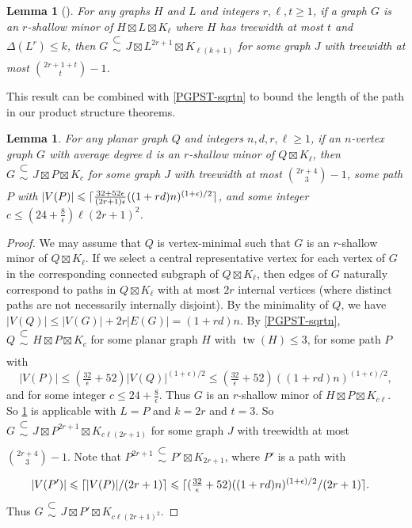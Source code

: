 \documentclass[11pt]{article}
\DeclarePairedDelimiter{\ceil}{\lceil}{\rceil}
\renewcommand{\geq}{\geqslant}
\renewcommand{\leq}{\leqslant}
\newcommand{\subsetsim}{\mathrel{\substack{\textstyle\subset\\[-0.3ex]\textstyle\sim\\[-0.4ex]}}}
\newcommand{\StrongProd}{\mathbin{\boxtimes}}
\DeclareMathOperator{\tw}{tw}
\theoremstyle{plain}
\newtheorem{lem}[thm]{Lemma}
\theoremstyle{definition}
\begin{document}
		\begin{lem}[\citep{HW24}]
		\label{ShallowMinor}
		For any graphs $H$ and $L$ and integers $r,\ell,t\geq 1$, if a graph $G$ is an $r$-shallow minor of $H \boxtimes L \boxtimes K_{\ell}$ where $H$ has treewidth at most $t$ and $\Delta(L^r)\leq k$, then $G \subsetsim J \boxtimes L^{2r+1} \boxtimes K_{\ell(k+1)}$ for some graph $J$ with treewidth at most $\binom{2r+1+t}{t}-1$.
		\end{lem}
		
		This result can be combined with \cref{PGPST-sqrtn} to bound the length of the path in our product structure theorems.
		
		\begin{lem}
		\label{PlanarShallowMinor}
        For any planar graph $Q$ and integers $n,d,r,\ell\geq 1$, if an $n$-vertex graph $G$ with average degree $d$ is an $r$-shallow minor of $Q\boxtimes K_\ell$, then $G \subsetsim J \boxtimes P \boxtimes K_c$ for some graph $J$ with treewidth at most $\binom{2r+4}{3}-1$, some path $P$ with $|V(P)|\leq 	\ceil{\tfrac{32+52\epsilon}{(2r+1)\epsilon} ((1+rd)n)^{(1+\epsilon)/2}}$, and some integer $c\leq (24+\frac{8}{\epsilon})\ell(2r+1)^2$.
       \end{lem}
		
		\begin{proof}
		We may assume that $Q$ is vertex-minimal such that $G$ is an $r$-shallow minor of $Q\boxtimes K_\ell$. 
        If we select a central representative vertex for each vertex of $G$ in the corresponding connected subgraph of $Q\boxtimes K_{\ell}$, then edges of $G$ naturally correspond to paths in $Q\boxtimes K_{\ell}$ with at most $2r$ internal vertices (where distinct paths are not necessarily internally disjoint).
        By the minimality of $Q$, we have $|V(Q)|\leq |V(G)|+2r|E(G)|= (1+rd)n$. By \cref{PGPST-sqrtn}, $Q\subsetsim H \StrongProd P \StrongProd K_c$ for some planar graph $H$ with $\tw(H)\leq 3$, for some path $P$ with 
        $$|V(P)|\leq 
			(\tfrac{32}{\epsilon}+52) |V(Q)|^{(1+\epsilon)/2} \leq
			(\tfrac{32}{\epsilon}+52) ((1+rd)n)^{(1+\epsilon)/2},$$ and for some integer 
		$c\leq 24+\frac{8}{\epsilon}$. Thus $G$ is an $r$-shallow minor of $H \StrongProd P \StrongProd K_{c\ell}$. So \cref{ShallowMinor} is applicable with $L=P$ and $k=2r$ and $t=3$. So $G \subsetsim J \boxtimes P^{2r+1} \boxtimes K_{c\ell(2r+1)}$ for some graph $J$ with treewidth at most $\binom{2r+4}{3}-1$.   
			Note that $P^{2r+1}\subsetsim P'\boxtimes K_{2r+1}$, where $P'$ is a path with 
			\begin{align*}
				|V(P')| \leq \ceil{ |V(P)|/(2r+1)} 
				& \leq 	\ceil{(\tfrac{32}{\epsilon}+52) ((1+rd)n)^{(1+\epsilon)/2} / (2r+1)}.
			\end{align*}
			Thus $G \subsetsim J \boxtimes P' \boxtimes K_{c\ell(2r+1)^2}$.
		\end{proof}
		
\end{document}
